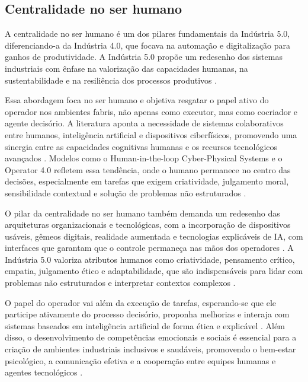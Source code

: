\subsection{Centralidade no ser humano}

A centralidade no ser humano é um dos pilares fundamentais da Indústria 5.0, diferenciando-a da Indústria 4.0, que focava na automação e digitalização para ganhos de produtividade.
A Indústria 5.0 propõe um redesenho dos sistemas industriais com ênfase na valorização das capacidades humanas, na sustentabilidade e na resiliência dos processos produtivos \cite{VALETTE2023, euCommission2021}.

Essa abordagem foca no ser humano e objetiva resgatar o papel ativo do operador nos ambientes fabris, não apenas como executor, mas como cocriador e agente decisório.
A literatura aponta a necessidade de sistemas colaborativos entre humanos, inteligência artificial e dispositivos ciberfísicos, promovendo uma sinergia entre as capacidades cognitivas humanas e os recursos tecnológicos avançados \cite{TOTH2023, Santana_2023}.
Modelos como o Human-in-the-loop Cyber-Physical Systems e o Operator 4.0 refletem essa tendência, onde o humano permanece no centro das decisões, especialmente em tarefas que exigem criatividade, julgamento moral, sensibilidade contextual e solução de problemas não estruturados \cite{VALETTE2023, RANNERTSHAUSER2022}.

O pilar da centralidade no ser humano também demanda um redesenho das arquiteturas organizacionais e tecnológicas, com a incorporação de dispositivos usáveis, gêmeos digitais, realidade aumentada e tecnologias explicáveis de IA, com interfaces que garantam que o controle permaneça nas mãos dos operadores \cite{TOTH2023, YANG2024}.
A Indústria 5.0 valoriza atributos humanos como criatividade, pensamento crítico, empatia, julgamento ético e adaptabilidade, que são indispensáveis para lidar com problemas não estruturados e interpretar contextos complexos \cite{RANNERTSHAUSER2022, Nahavandi2019}.

O papel do operador vai além da execução de tarefas, esperando-se que ele participe ativamente do processo decisório, proponha melhorias e interaja com sistemas baseados em inteligência artificial de forma ética e explicável \cite{TOTH2023, PIZON2023}.
Além disso, o desenvolvimento de competências emocionais e sociais é essencial para a criação de ambientes industriais inclusivos e saudáveis, promovendo o bem-estar psicológico, a comunicação efetiva e a cooperação entre equipes humanas e agentes tecnológicos \cite{Santana_2023}.

